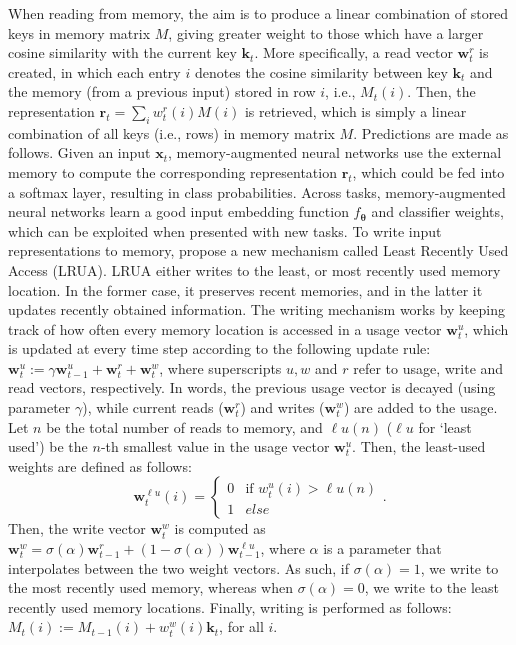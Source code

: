 When reading from memory, the aim is to produce a linear combination of stored keys in memory matrix $M$, giving greater weight to those which have a larger cosine similarity with the current key $\boldsymbol{k}_{t}$. More specifically, a read vector $\boldsymbol{w}^{r}_{t}$ is created, in which each entry $i$ denotes the cosine similarity between key $\boldsymbol{k}_{t}$ and the memory (from a previous input) stored in row $i$, i.e., $M_{t}(i)$. Then, the representation $\boldsymbol{r}_{t} = \sum_{i}w_{t}^{r}(i)M(i)$ is retrieved, which is simply a linear combination of all keys (i.e., rows) in memory matrix $M$. 
Predictions are made as follows. Given an input $\boldsymbol{x}_{t}$, memory-augmented neural networks use the external memory to compute the corresponding representation $\boldsymbol{r}_{t}$, which could be fed into a softmax layer, resulting in class probabilities. 
Across tasks, memory-augmented neural networks learn a good input embedding function $f_{\boldsymbol{\theta}}$ and classifier weights, which can be exploited when presented with new tasks.
To write input representations to memory,  propose a new mechanism called Least Recently Used Access (LRUA). LRUA either writes to the least, or most recently used memory location. In the former case, it preserves recent memories, and in the latter it updates recently obtained information. The writing mechanism works by keeping track of how often every memory location is accessed in a usage vector $\boldsymbol{w}_{t}^{u}$, which is updated at every time step according to the following update rule: $\boldsymbol{w}_{t}^{u} := \gamma \boldsymbol{w}^{u}_{t-1} + \boldsymbol{w}_{t}^{r} + \boldsymbol{w}_{t}^{w}$, where superscripts $u,w$ and $r$ refer to usage, write and read vectors, respectively. In words, the previous usage vector is decayed (using parameter $\gamma$), while current reads ($\boldsymbol{w}_{t}^{r}$) and writes ($\boldsymbol{w}_{t}^{w}$) are added to the usage.  Let $n$ be the total number of reads to memory, and $\ell u(n)$ ($\ell u$ for `least used') be the $n$-th smallest value in the usage vector $\boldsymbol{w}^{u}_{t}$. Then, the least-used weights are defined as follows: $$\boldsymbol{w}^{\ell u}_{t}(i) = 
\begin{cases} 
  0 & \text{if $w^{u}_{t}(i) > \ell u(n)$} \\
  1 & else
\end{cases}.$$ Then, the write vector $\boldsymbol{w}_{t}^{w}$ is computed as $\boldsymbol{w}^{w}_{t} = \sigma(\alpha) \boldsymbol{w}^{r}_{t-1} + (1 - \sigma(\alpha))\boldsymbol{w}^{\ell u}_{t-1}$, where $\alpha$ is a parameter that interpolates between the two weight vectors. As such, if $\sigma(\alpha) = 1$, we write to the most recently used memory, whereas when $\sigma(\alpha) = 0$, we write to the least recently used memory locations. Finally, writing is performed as follows: $M_{t}(i) := M_{t-1}(i) + w_{t}^{w}(i)\boldsymbol{k}_{t}$, for all $i$. 
